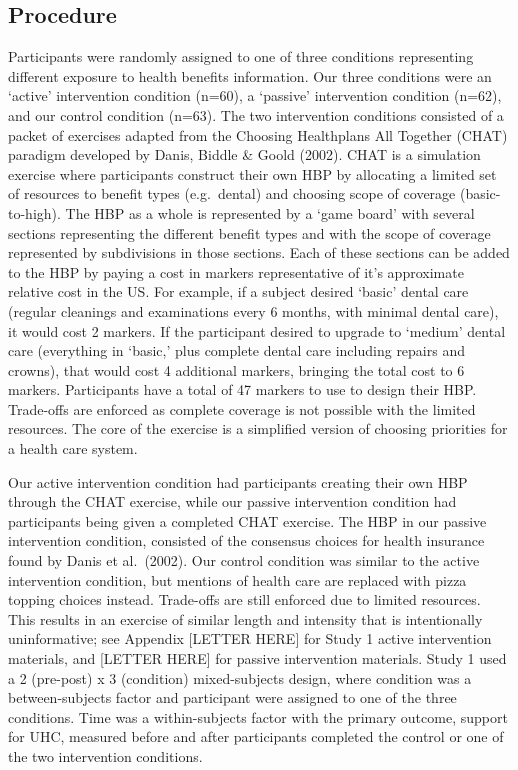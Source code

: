 \documentclass[
  english,
  man]{apa6}
\begin{document}
\hypertarget{procedure-1}{%
\subsection{Procedure}\label{procedure-1}}

Participants were randomly assigned to one of three conditions representing different exposure to health benefits information. Our three conditions were an `active' intervention condition (n=60), a `passive' intervention condition (n=62), and our control condition (n=63). The two intervention conditions consisted of a packet of exercises adapted from the Choosing Healthplans All Together (CHAT) paradigm developed by Danis, Biddle \& Goold (2002). CHAT is a simulation exercise where participants construct their own HBP by allocating a limited set of resources to benefit types (e.g.~dental) and choosing scope of coverage (basic-to-high). The HBP as a whole is represented by a `game board' with several sections representing the different benefit types and with the scope of coverage represented by subdivisions in those sections. Each of these sections can be added to the HBP by paying a cost in markers representative of it's approximate relative cost in the US. For example, if a subject desired `basic' dental care (regular cleanings and examinations every 6 months, with minimal dental care), it would cost 2 markers. If the participant desired to upgrade to `medium' dental care (everything in `basic,' plus complete dental care including repairs and crowns), that would cost 4 additional markers, bringing the total cost to 6 markers. Participants have a total of 47 markers to use to design their HBP. Trade-offs are enforced as complete coverage is not possible with the limited resources. The core of the exercise is a simplified version of choosing priorities for a health care system.

Our active intervention condition had participants creating their own HBP through the CHAT exercise, while our passive intervention condition had participants being given a completed CHAT exercise. The HBP in our passive intervention condition, consisted of the consensus choices for health insurance found by Danis et al.~(2002). Our control condition was similar to the active intervention condition, but mentions of health care are replaced with pizza topping choices instead. Trade-offs are still enforced due to limited resources. This results in an exercise of similar length and intensity that is intentionally uninformative; see Appendix {[}LETTER HERE{]} for Study 1 active intervention materials, and {[}LETTER HERE{]} for passive intervention materials. Study 1 used a 2 (pre-post) x 3 (condition) mixed-subjects design, where condition was a between-subjects factor and participant were assigned to one of the three conditions. Time was a within-subjects factor with the primary outcome, support for UHC, measured before and after participants completed the control or one of the two intervention conditions.
\end{document}
